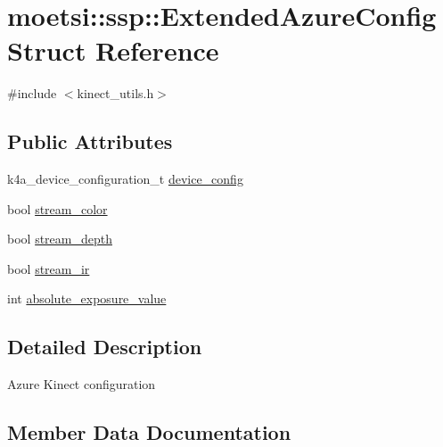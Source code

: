 \hypertarget{structmoetsi_1_1ssp_1_1ExtendedAzureConfig}{}\section{moetsi\+:\+:ssp\+:\+:Extended\+Azure\+Config Struct Reference}
\label{structmoetsi_1_1ssp_1_1ExtendedAzureConfig}


{\ttfamily \#include $<$kinect\+\_\+utils.\+h$>$}

\subsection*{Public Attributes}
\begin{DoxyCompactItemize}
\item 
k4a\+\_\+device\+\_\+configuration\+\_\+t \hyperlink{structmoetsi_1_1ssp_1_1ExtendedAzureConfig_a59803eec12939eece3811e3e5d2169e8}{device\+\_\+config}
\item 
bool \hyperlink{structmoetsi_1_1ssp_1_1ExtendedAzureConfig_a602b49142877ef3f88972153cb1478d1}{stream\+\_\+color}
\item 
bool \hyperlink{structmoetsi_1_1ssp_1_1ExtendedAzureConfig_ae189c45e7f654e635d802713814cda3e}{stream\+\_\+depth}
\item 
bool \hyperlink{structmoetsi_1_1ssp_1_1ExtendedAzureConfig_ab4c4fd8a25fe1a5c97aace78bc6d987c}{stream\+\_\+ir}
\item 
int \hyperlink{structmoetsi_1_1ssp_1_1ExtendedAzureConfig_acc60c61ea4d7717f1982f177c56662ea}{absolute\+\_\+exposure\+\_\+value}
\end{DoxyCompactItemize}


\subsection{Detailed Description}
Azure Kinect configuration 

\subsection{Member Data Documentation}
\mbox{\label{structmoetsi_1_1ssp_1_1ExtendedAzureConfig_acc60c61ea4d7717f1982f177c56662ea}} 
